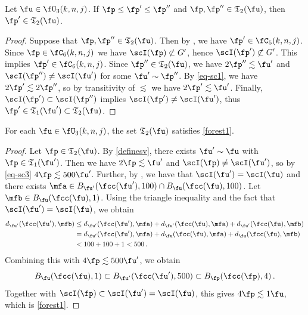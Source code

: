 \begin{lemma}[C6 convex] %
    \label{C6-convex}
    Let $\fu \in \fU_3(k,n,j)$. If $\fp \le \fp' \le \fp''$ and $\fp, \fp'' \in \mathfrak{T}_2(\fu)$, then $\fp' \in \mathfrak{T}_2(\fu)$.
\end{lemma}

\begin{proof}
    Suppose that $\fp, \fp'' \in \mathfrak{T}_2(\fu)$. Then by , we have
$\fp' \in \fC_5(k,n,j)$. Since $\fp \in \fC_6(k,n,j)$ we have $\scI(\fp) \not\subset G'$, hence $\scI(\fp') \not \subset G'$. This implies $\fp' \in \fC_6(k,n,j)$. Since $\fp'' \in \mathfrak{T}_2(\fu)$, we have $2\fp'' \lesssim \fu'$ and $\scI(\fp'')\ne\scI(\fu')$ for some $\fu' \sim \fp''$. By \eqref{eq-sc1}, we have $2\fp' \lesssim 2\fp''$, so by transitivity of $\lesssim$ we have $2\fp' \lesssim \fu'$. Finally, $\scI(\fp') \subset \scI(\fp'')$ implies $\scI(\fp') \ne \scI(\fu')$, thus $\fp' \in \mathfrak{T}_1(\fu') \subset \mathfrak{T}_2(\fu)$.
\end{proof}


\begin{lemma}
    \label{forest-geometry}
    \leanok
    For each $\fu\in \fU_3(k,n,j)$,
    the set $\mathfrak{T}_2(\fu)$
    satisfies \eqref{forest1}.
\end{lemma}
\begin{proof}
    Let $\fp \in \mathfrak{T}_2(\fu)$. By \eqref{definesv}, there exists $\fu' \sim \fu$ with $\fp \in \mathfrak{T}_1(\fu')$. Then we have $2\fp \lesssim \fu'$ and $\scI(\fp) \ne \scI(\fu')$, so by \eqref{eq-sc3} $4\fp \lesssim 500\fu'$.
    Further, by , we have that $\scI(\fu') = \scI(\fu)$ and there exists $\mfa \in B_{\fu'}(\fcc(\fu'),100) \cap B_{\fu}(\fcc(\fu),100)$.
    Let $\mfb \in B_{\fu}(\fcc(\fu), 1)$.
    Using the triangle inequality and the fact that $\scI(\fu') =\scI(\fu)$, we obtain
    \begin{align*}
        d_{\fu'}(\fcc(\fu'), \mfb) &\le d_{\fu'}(\fcc(\fu'), \mfa) + d_{\fu'}(\fcc(\fu), \mfa) + d_{\fu'}(\fcc(\fu), \mfb)\\
        &= d_{\fu'}(\fcc(\fu'), \mfa) + d_{\fu}(\fcc(\fu), \mfa) + d_{\fu}(\fcc(\fu), \mfb)\\
        &< 100 + 100 + 1 < 500\,.
    \end{align*}
    Combining this with $4\fp \lesssim 500\fu'$, we obtain
    $$
        B_{\fu}(\fcc(\fu), 1) \subset B_{\fu'}(\fcc(\fu'), 500) \subset B_{\fp}(\fcc(\fp), 4)\,.
    $$
    Together with $\scI(\fp) \subset \scI(\fu') = \scI(\fu)$, this gives $4\fp \lesssim 1\fu$, which is \eqref{forest1}.
\end{proof}

